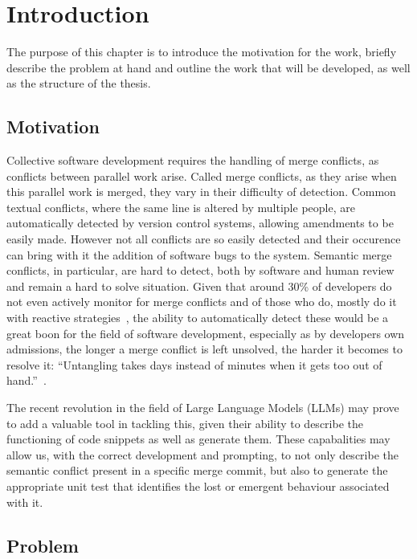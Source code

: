 \chapter{Introduction} \label{chap:intro}

The purpose of this chapter is to introduce the motivation for the work, briefly describe the problem at hand and outline the work that will be developed, as well as the structure of the thesis.

\section{Motivation} \label{sec:motivation}

Collective software development requires the handling of merge conflicts, as conflicts between parallel work arise. Called merge conflicts, as they arise when this parallel work is merged, they vary in their difficulty of detection.
Common textual conflicts, where the same line is altered by multiple people, are automatically detected by version control systems, allowing amendments to be easily made. However not all conflicts are so easily detected and their occurence can bring with it the addition of software bugs to the system. Semantic merge conflicts, in particular, are hard to detect, both by software and human review and remain a hard to solve situation. Given that around 30\% of developers do not even actively monitor for merge conflicts and of those who do, mostly do it with reactive strategies~\cite{kn:lifecycle}, the ability to automatically detect these would be a great boon for the field of software development, especially as by developers own admissions, the longer a merge conflict is left unsolved, the harder it becomes to resolve it: ``Untangling takes days instead of minutes when it gets too out of hand.''~\cite{kn:lifecycle}.

The recent revolution in the field of Large Language Models (LLMs) may prove to add a valuable tool in tackling this, given their ability to describe the functioning of code snippets as well as generate them. These capabalities may allow us, with the correct development and prompting, to not only describe the semantic conflict present in a specific merge commit, but also to generate the appropriate unit test that identifies the lost or emergent behaviour associated with it.


\section{Problem} \label{sec:problem}

